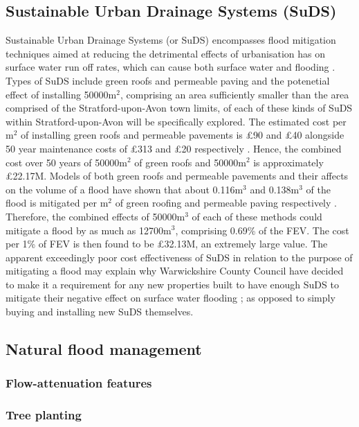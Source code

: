 \documentclass[11pt,a4paper]{article}
\begin{document}
\subsection{Sustainable Urban Drainage Systems (SuDS)}
Sustainable Urban Drainage Systems (or SuDS) encompasses flood mitigation techniques aimed at reducing the detrimental effects of urbanisation has on surface water run off rates, which can cause both surface water and flooding \cite{suds}. Types of SuDS include green roofs and permeable paving and the potenetial effect of installing 50000m$^2$, comprising an area sufficiently smaller than the area comprised of the Stratford-upon-Avon town limits, of each of these kinds of SuDS within Stratford-upon-Avon will be specifically explored. The estimated cost per m$^2$ of installing green roofs and permeable pavements is \pounds90 and \pounds40 alongside 50 year maintenance costs of \pounds313 and \pounds20 respectively \cite{cost3}. Hence, the combined cost over 50 years of 50000m$^2$ of green roofs and 50000m$^2$ is approximately \pounds22.17M. Models of both green roofs and permeable pavements and their affects on the volume of a flood have shown that about 0.116m$^3$ and 0.138m$^3$ of the flood is mitigated per m$^2$ of green roofing and permeable paving respectively \cite{suds}. Therefore, the combined effects of 50000m$^3$ of each of these methods could mitigate a flood by as much as 12700m$^3$, comprising 0.69\% of the FEV. The cost per 1\% of FEV is then found to be \pounds32.13M, an extremely large value. The apparent exceedingly poor cost effectiveness of SuDS in relation to the purpose of mitigating a flood may explain why Warwickshire County Council have decided to make it a requirement for any new properties built to have enough SuDS to mitigate their negative effect on surface water flooding \cite{war2}{;} as opposed to simply buying and installing new SuDS themselves.

\subsection{Natural flood management}

\subsubsection{Flow-attenuation features}

\subsubsection{Tree planting}
\end{document}
